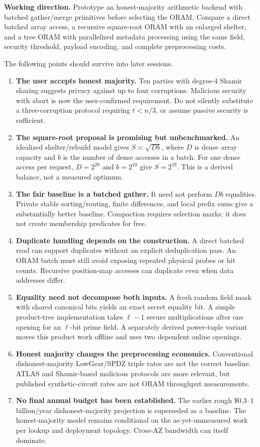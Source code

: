 \documentclass[11pt]{article}
\begin{document}
\textbf{Working direction.} Prototype an honest-majority arithmetic backend
with batched gather/merge primitives before selecting the ORAM. Compare a direct
batched array access, a recursive square-root ORAM with an enlarged shelter,
and a tree ORAM with parallelized metadata processing using the same field,
security threshold, payload encoding, and complete preprocessing costs.

The following points should survive into later sessions.
\begin{enumerate}
\item \textbf{The user accepts honest majority.} Ten parties with degree-4
Shamir sharing suggests privacy against up to four corruptions. Malicious
security with abort is now the user-confirmed requirement. Do not silently substitute a three-corruption protocol
requiring $t<n/3$, or assume passive security is sufficient.
\item \textbf{The square-root proposal is promising but unbenchmarked.}
An idealized shelter/rebuild model gives $S\asymp\sqrt{Db}$, where $D$ is dense
array capacity and $b$ is the number of dense accesses in a batch. For one dense
access per request, $D=2^{28}$ and $b=2^{10}$ give $S=2^{19}$.
This is a derived balance, not a measured optimum.
\item \textbf{The fair baseline is a batched gather.} It need not perform
$Db$ equalities. Private stable sorting/routing, finite differences, and local
prefix sums give a substantially better baseline. Compaction requires selection
marks; it does not create membership predicates for free.
\item \textbf{Duplicate handling depends on the construction.} A direct
batched read can support duplicates without an explicit deduplication pass.
An ORAM batch must still avoid exposing repeated physical probes or hit counts.
Recursive position-map accesses can duplicate even when data addresses differ.
\item \textbf{Equality need not decompose both inputs.} A fresh random field
mask with shared canonical bits yields an exact secret equality bit. A simple
product-tree implementation takes $\ell-1$ secure multiplications after one
opening for an $\ell$-bit prime field. A separately derived power-tuple variant
moves this product work offline and uses two dependent online openings.
\item \textbf{Honest majority changes the preprocessing economics.}
Conventional dishonest-majority LowGear/SPDZ triple rates are not the correct
baseline. ATLAS and Shamir-based malicious protocols are more relevant, but
published synthetic-circuit rates are not ORAM throughput measurements.
\item \textbf{No final annual budget has been established.} The earlier
rough \$0.3--1 billion/year dishonest-majority projection is superseded as a
baseline. The honest-majority model remains conditional on the as-yet-unmeasured
work per lookup and deployment topology. Cross-AZ bandwidth can itself dominate.
\end{enumerate}
\end{document}
